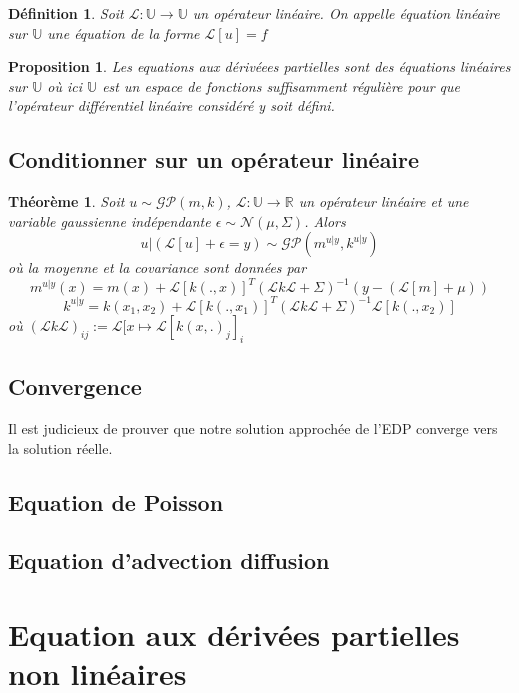 \documentclass[a4paper,12pt]{article}
\newtheorem{definition}{Définition}
\newtheorem{proposition}{Proposition}
\newtheorem{theorem}{Théorème}
\begin{document}
\begin{definition}
    Soit $\mathcal{L}:\mathbb{U}\to\mathbb{U}$ un opérateur linéaire.
    On appelle équation linéaire sur $\mathbb{U}$ une équation de la forme
    $\mathcal{L}[u] = f$
\end{definition}

\begin{proposition}
    Les equations aux dérivéees partielles sont des équations linéaires sur
    $\mathbb{U}$ où ici $\mathbb{U}$ est un espace de fonctions suffisamment
    régulière pour que l'opérateur différentiel linéaire considéré y soit 
    défini.
\end{proposition}

\subsection{Conditionner sur un opérateur linéaire}

\begin{theorem}
    Soit $u\sim\mathcal{GP}(m,k)$, $\mathcal{L}:\mathbb{U}\to\mathbb{R}$ un opérateur linéaire et une variable gaussienne indépendante $\epsilon \sim \mathcal{N}(\mu,\Sigma)$. Alors 
$$
u | (\mathcal{L}[u]+\epsilon=y)\sim\mathcal{GP}(m^{u|y},k^{u|y})
$$
où la moyenne et la covariance sont données par 
$$
m^{u|y}(x)=m(x)+\mathcal{L}[k(.,x)]^{T}(\mathcal{L}k\mathcal{L}+\Sigma)^{-1}(y-(\mathcal{L}[m]+\mu))
$$
$$
k^{u|y}=k(x_1,x_2)+\mathcal{L}[k(.,x_1)]^{T}(\mathcal{L}k\mathcal{L}+\Sigma)^{-1}\mathcal{L}[k(.,x_2)]
$$
où $(\mathcal{L}k\mathcal{L})_{ij}:=\mathcal{L}[x\mapsto\mathcal{L}[k(x,.)_j]_i$
\end{theorem}

\subsection{Convergence}

Il est judicieux de prouver que notre solution approchée de l'EDP converge vers la solution réelle.

\subsection{Equation de Poisson}

\subsection{Equation d'advection diffusion}

\section{Equation aux dérivées partielles non linéaires}
\end{document}

